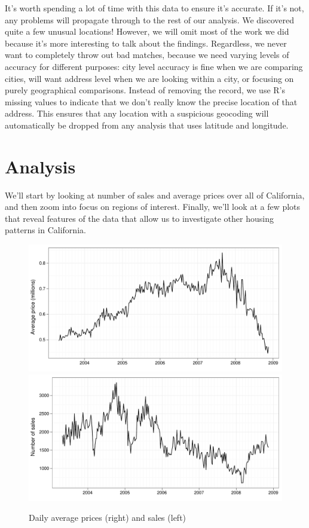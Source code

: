 \documentclass[oneside]{article}
\begin{document}
It's worth spending a lot of time with this data to ensure it's accurate.  If it's not, any problems will propagate through to the rest of our analysis.  We discovered quite a few unusual locations!  However, we will omit most of the work we did because it's more interesting to talk about the findings.  Regardless, we never want to completely throw out bad matches, because we need varying levels of accuracy for different purposes: city level accuracy is fine when we are comparing cities, will want address level when we are looking within a city, or focusing on purely geographical comparisons.  Instead of removing the record, we use R's missing values to indicate that we don't really know the precise location of that address.  This ensures that any location with a suspicious geocoding will automatically be dropped from any analysis that uses latitude and longitude.


\section{Analysis}

We'll start by looking at number of sales and average prices over all of California, and then zoom into focus on regions of interest.  Finally, we'll look at a few plots that reveal features of the data that allow us to investigate other housing patterns in California.

\begin{figure}[htbp]
  \centering
    \includegraphics[width=0.5 \linewidth]{daily-price}%
    \includegraphics[width=0.5 \linewidth]{daily-sales}
  \caption{Daily average prices (right) and sales (left)}
  \label{fig:daily}
\end{figure}
\end{document}
